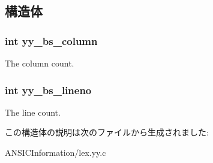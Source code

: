 \subsection{構造体}
\subsubsection[{yy\_\-bs\_\-column}]{\setlength{\rightskip}{0pt plus 5cm}int {\bf yy\_\-bs\_\-column}}\label{structyy__buffer__state_ad9867983bbc1666304d83623cd6e3dd8}
The column count. 
\subsubsection[{yy\_\-bs\_\-lineno}]{\setlength{\rightskip}{0pt plus 5cm}int {\bf yy\_\-bs\_\-lineno}}\label{structyy__buffer__state_a59c414c619ca0071fe3a091336106d82}
The line count. 

この構造体の説明は次のファイルから生成されました:\begin{DoxyCompactItemize}
\item 
ANSICInformation/lex.yy.c\end{DoxyCompactItemize}
